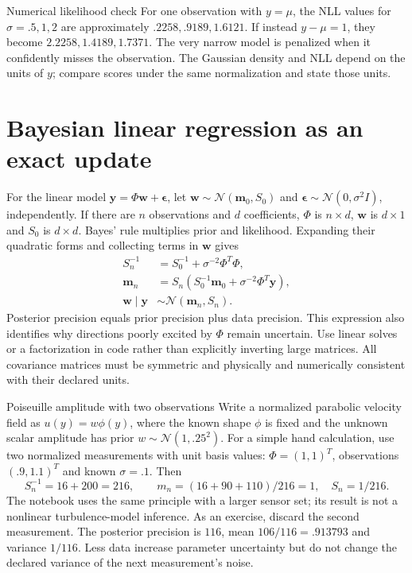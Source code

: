 \documentclass[11pt]{article}
\begin{document}
\begin{worked}{Numerical likelihood check}
For one observation with $y=\mu$, the NLL values for $\sigma=.5,1,2$ are
approximately $.2258,.9189,1.6121$. If instead $y-\mu=1$, they become
$2.2258,1.4189,1.7371$. The very narrow model is penalized when it confidently
misses the observation. The Gaussian density and NLL depend on the units of
$y$; compare scores under the same normalization and state those units.
\end{worked}

\section{Bayesian linear regression as an exact update}
For the linear model $\mathbf y=\Phi\mathbf w+\boldsymbol\epsilon$, let
$\mathbf w\sim\mathcal N(\mathbf m_0,S_0)$ and
$\boldsymbol\epsilon\sim\mathcal N(0,\sigma^2I)$, independently. If there
are $n$ observations and $d$ coefficients, $\Phi$ is $n\times d$,
$\mathbf w$ is $d\times1$ and $S_0$ is $d\times d$.
Bayes' rule multiplies prior and likelihood. Expanding their quadratic forms
and collecting terms in $\mathbf w$ gives
\begin{align*}
S_n^{-1}&=S_0^{-1}+\sigma^{-2}\Phi^T\Phi,\\
\mathbf m_n&=S_n(S_0^{-1}\mathbf m_0+\sigma^{-2}\Phi^T\mathbf y),\\
\mathbf w\mid\mathbf y&\sim\mathcal N(\mathbf m_n,S_n).
\end{align*}
Posterior precision equals prior precision plus data precision. This expression
also identifies why directions poorly excited by $\Phi$ remain uncertain.
Use linear solves or a factorization in code rather than explicitly inverting
large matrices. All covariance matrices must be symmetric and physically and
numerically consistent with their declared units.

\begin{worked}{Poiseuille amplitude with two observations}
Write a normalized parabolic velocity field as $u(y)=w\phi(y)$, where the
known shape $\phi$ is fixed and the unknown scalar amplitude has prior
$w\sim\mathcal N(1,.25^2)$. For a simple hand calculation, use two normalized
measurements with unit basis values: $\Phi=(1,1)^T$, observations $(.9,1.1)^T$
and known $\sigma=.1$. Then
\[
S_n^{-1}=16+200=216,\qquad m_n=(16+90+110)/216=1,
\quad S_n=1/216.
\]
The notebook uses the same principle with a larger sensor set; its result is
not a nonlinear turbulence-model inference. As an exercise, discard the second
measurement. The posterior precision is $116$, mean $106/116=.913793$ and
variance $1/116$. Less data increase parameter uncertainty but do not change
the declared variance of the next measurement's noise.
\end{worked}
\end{document}
